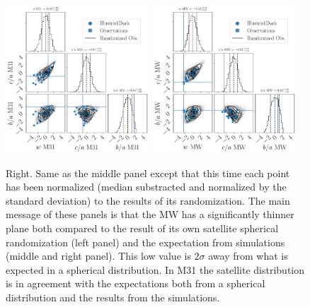 \documentclass[a4paper,fleqn,usenatbib]{mnras}
\begin{document}
\begin{figure}
\centering
\includegraphics[width=0.48\textwidth]{input_illustris1dark_obs_M31_n_11_normed.pdf}
\includegraphics[width=0.48\textwidth]{input_illustris1dark_obs_MW_n_11_normed.pdf}
\caption{Right. Same as the middle panel except that this time each point has
been normalized (median substracted and normalized by the standard
deviation) to the results of its randomization. 
The main message of these panels is that the MW has a significantly
thinner plane both compared to the result of its own satellite
spherical randomization (left panel) and the expectation from
simulations (middle and right panel).  
This low value is $2\sigma$ away from what is expected in a spherical
distribution. 
In M31 the satellite distribution is in agreement with the
expectations both from a spherical distribution and the results from the
simulations. }
\end{figure}
\end{document}
